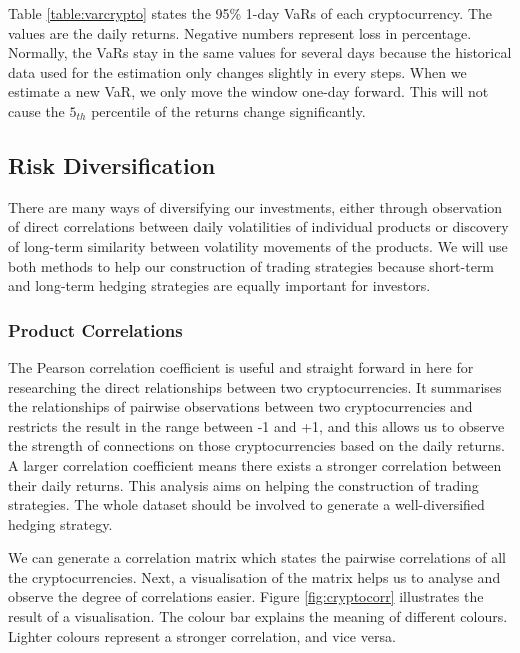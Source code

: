 \documentclass[11pt]{article} %
\theoremstyle{plain}
\theoremstyle{definition}
\begin{document}
Table \ref{table:varcrypto} states the 95\% 1-day VaRs of each cryptocurrency. The values are the daily returns. Negative numbers represent loss in percentage. Normally, the VaRs stay in the same values for several days because the historical data used for the estimation only changes slightly in every steps. When we estimate a new VaR, we only move the window one-day forward. This will not cause the $5_{th}$ percentile of the returns change significantly.

\subsection{Risk Diversification}

There are many ways of diversifying our investments, either through observation of direct correlations between daily volatilities of individual products or discovery of long-term similarity between volatility movements of the products. We will use both methods to help our construction of trading strategies because short-term and long-term hedging strategies are equally important for investors.

\subsubsection{Product Correlations}

The Pearson correlation coefficient is useful and straight forward in here for researching the direct relationships between two cryptocurrencies. It summarises the relationships of pairwise observations between two cryptocurrencies and restricts the result in the range between -1 and +1, and this allows us to observe the strength of connections on those cryptocurrencies based on the daily returns. A larger correlation coefficient means there exists a stronger correlation between their daily returns. This analysis aims on helping the construction of trading strategies. The whole dataset should be involved to generate a well-diversified hedging strategy.

We can generate a correlation matrix which states the pairwise correlations of all the cryptocurrencies. Next, a visualisation of the matrix helps us to analyse and observe the degree of correlations easier. Figure \ref{fig:cryptocorr} illustrates the result of a visualisation. The colour bar explains the meaning of different colours. Lighter colours represent a stronger correlation, and vice versa.
\end{document}
